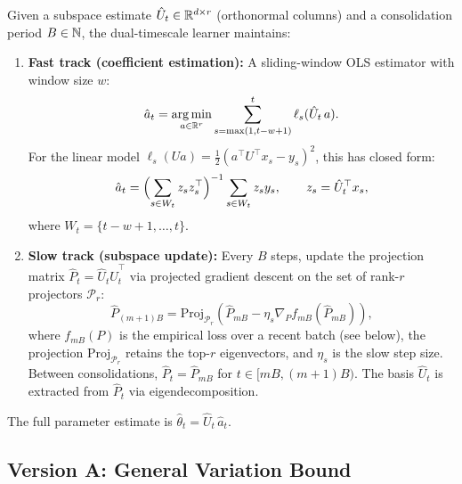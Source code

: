 \begin{definition}
\label{def:dual-timescale}
Given a subspace estimate $\hat{U}_t \in \mathbb{R}^{d \times r}$ (orthonormal
columns) and a consolidation period $B \in \mathbb{N}$, the dual-timescale
learner maintains:

\begin{enumerate}[nosep]
  \item \textbf{Fast track (coefficient estimation):} A sliding-window
    OLS estimator with window size $w$:
    \[
      \hat{a}_t = \operatorname*{arg\,min}_{a \in \mathbb{R}^r}
      \sum_{s=\max(1,t-w+1)}^{t} \ell_s(\hat{U}_t\, a).
    \]
    For the linear model $\ell_s(U a) = \frac{1}{2}(a^\top U^\top x_s - y_s)^2$,
    this has closed form:
    \[
      \hat{a}_t = \Bigl(\sum_{s \in W_t} z_s z_s^\top\Bigr)^{-1}
      \sum_{s \in W_t} z_s y_s,
      \qquad z_s = \hat{U}_t^\top x_s,
    \]
    where $W_t = \{t-w+1, \ldots, t\}$.

  \item \textbf{Slow track (subspace update):} Every $B$ steps, update
    the projection matrix $\hat{P}_t = \hat{U}_t\hat{U}_t^\top$ via
    projected gradient descent on the set of rank-$r$ projectors
    $\mathcal{P}_r$:
    \[
      \hat{P}_{(m+1)B} = \mathrm{Proj}_{\mathcal{P}_r}\!\left(
        \hat{P}_{mB} - \eta_s \nabla_P f_{mB}(\hat{P}_{mB})
      \right),
    \]
    where $f_{mB}(P)$ is the empirical loss over a recent batch
    (see  below), the projection
    $\mathrm{Proj}_{\mathcal{P}_r}$ retains the top-$r$ eigenvectors,
    and $\eta_s$ is the slow step size. Between consolidations,
    $\hat{P}_t = \hat{P}_{mB}$ for $t \in [mB, (m+1)B)$.
    The basis $\hat{U}_t$ is extracted from $\hat{P}_t$ via eigendecomposition.
\end{enumerate}
The full parameter estimate is $\hat{\theta}_t = \hat{U}_t\, \hat{a}_t$.
\end{definition}

\subsection{Version A: General Variation Bound}


